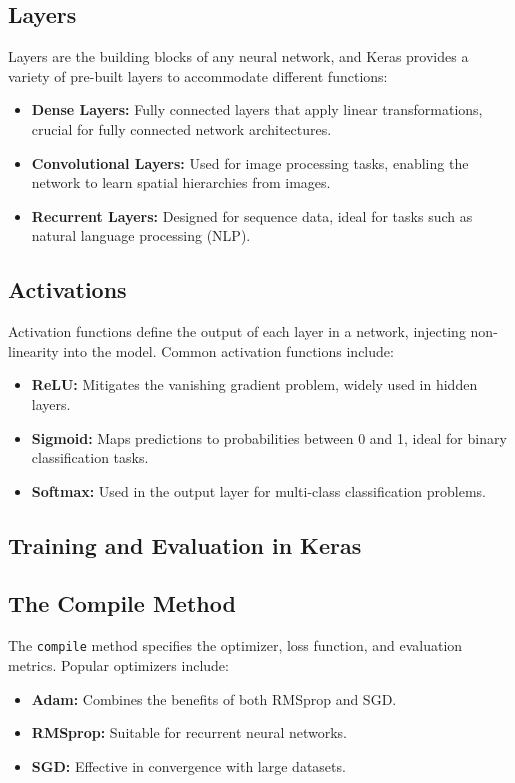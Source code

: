 	\subsection*{Layers}
	Layers are the building blocks of any neural network, and Keras provides a variety of pre-built layers to accommodate different functions:
	\begin{itemize}
		\item \textbf{Dense Layers:} Fully connected layers that apply linear transformations, crucial for fully connected network architectures.
		\item \textbf{Convolutional Layers:} Used for image processing tasks, enabling the network to learn spatial hierarchies from images.
		\item \textbf{Recurrent Layers:} Designed for sequence data, ideal for tasks such as natural language processing (NLP).\cite{Keras:2024}
	\end{itemize}
	
	\subsection*{Activations}
	Activation functions define the output of each layer in a network, injecting non-linearity into the model. Common activation functions include:
	\begin{itemize}
		\item \textbf{ReLU:} Mitigates the vanishing gradient problem, widely used in hidden layers.
		\item \textbf{Sigmoid:} Maps predictions to probabilities between 0 and 1, ideal for binary classification tasks.
		\item \textbf{Softmax:} Used in the output layer for multi-class classification problems.\cite{Keras:2024}
	\end{itemize}
	
	\subsection*{Training and Evaluation in Keras}
	\subsection*{The Compile Method}
	The \texttt{compile} method specifies the optimizer, loss function, and evaluation metrics. Popular optimizers include:
	\begin{itemize}
		\item \textbf{Adam:} Combines the benefits of both RMSprop and SGD.
		\item \textbf{RMSprop:} Suitable for recurrent neural networks.
		\item \textbf{SGD:} Effective in convergence with large datasets.
	\end{itemize}
	
